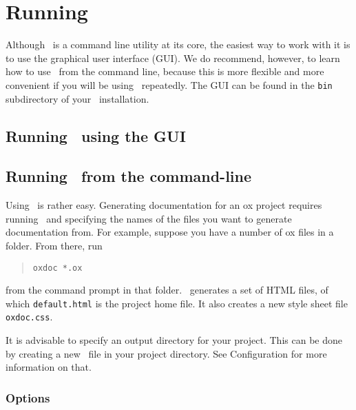 \chapter{Running \oxdoc}
Although \oxdoc~is a command line utility at its core, the easiest way to work with it is to use
the graphical user interface (GUI).  We do recommend, however, to learn how to use \oxdoc~from the 
command line, because this is more flexible and more convenient if you will
be using \oxdoc~repeatedly. The GUI can be found in the {\tt bin} subdirectory
of your \oxdoc~installation.

\section{Running \oxdoc~using the GUI}



\section{Running \oxdoc~from the command-line}
Using \oxdoc~is rather easy. Generating documentation for an ox project
requires running \oxdoc~and specifying the names of the files you
want to generate documentation from. For example, suppose you have a number
of ox files in a folder. From there, run 
\begin{quote}
\tt oxdoc *.ox
\end{quote}

from the command prompt in that folder. \oxdoc~generates a set
of HTML files, of which {\tt default.html} is the project home file. It also
creates a new style sheet file {\tt oxdoc.css}.

It is advisable to specify an output directory for your project. This can
be done by creating a new \oxdocxml~file in your project directory. See 
Configuration for more information on that.


\subsection{Options}

